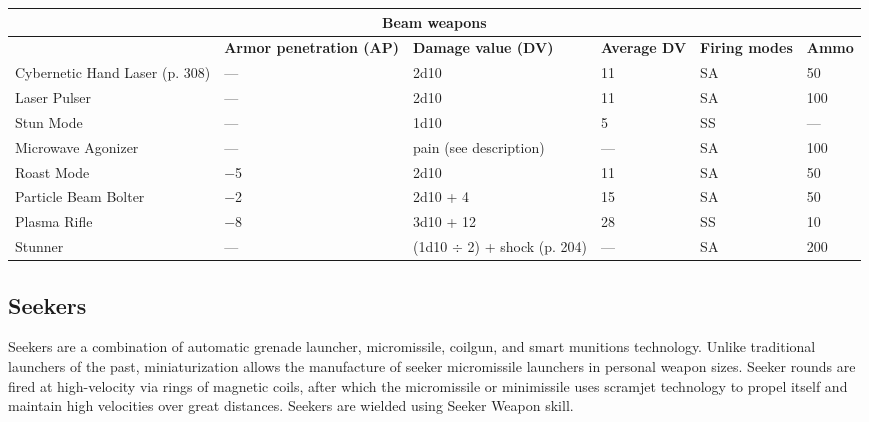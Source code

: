 \begin{table} \begin{tabularx}{\textwidth}{|X|X|X|X|l|l|} \hline

\multicolumn{6}{|c|}{\textbf{Beam weapons}} \\ \hline

&\textbf{Armor penetration (AP)}	&\textbf{Damage value (DV)}	&\textbf{Average DV}	&\textbf{Firing modes}	&\textbf{Ammo} \\ \hline

Cybernetic Hand Laser (p. 308)	&--- &2d10	&11	&SA	&50 \\ \hline

Laser Pulser	&--- &2d10	&11	&SA	&100 \\ \hline

Stun Mode	&--- &1d10	&5	&SS	&--- \\ \hline

Microwave Agonizer	&--- &pain (see description)	&--- &SA	&100 \\ \hline

Roast Mode	&$-$5	&2d10	&11	&SA	&50 \\ \hline

Particle Beam Bolter	&$-$2	&2d10 + 4	&15	&SA	&50 \\ \hline

Plasma Rifle	&$-$8	&3d10 + 12	&28	&SS	&10 \\ \hline

Stunner	&--- &(1d10 $\div$ 2) + shock (p. 204)	&--- &SA	&200 \\ \hline

\end{tabularx} \label{tab:beam-weapons} \end{table} 



\subsection{Seekers} \label{sec:seekers} 

Seekers are a combination of automatic grenade launcher, micromissile, coilgun, and smart munitions technology. Unlike traditional launchers of the past, miniaturization allows the manufacture of seeker micromissile launchers in personal weapon sizes. Seeker rounds are fired at high-velocity via rings of magnetic coils, after which the micromissile or minimissile uses scramjet technology to propel itself and maintain high velocities over great distances. Seekers are wielded using Seeker Weapon skill. 

